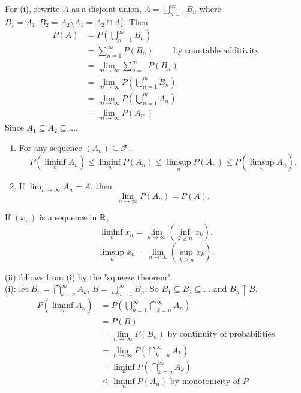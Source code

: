 \documentclass[class=article,crop=false]{standalone}
\begin{document}
\begin{prf}
	For (i), rewrite  $A$ as a disjoint union,  $A = \bigcup_{ n =1}^{\infty} B_n$ where $B_1=A_1, B_2 = A_2 \setminus A_1 = A_2 \cap A_1^{c} $. Then
	\begin{align*}
		P(A) &= P(\bigcup_{ n =1}^{\infty} B_n)\\
		     &= \sum_{ n=1}^{\infty} P(B_n) \qquad \text{ by countable additivity} \\
		     &= \lim_{ m \to \infty} \sum_{ n=1}^{ m} P(B_n) \\
		     &= \lim_{ m \to \infty} P\left( \bigcup_{ n=1}^{m} B_n \right)  \\
		     &= \lim_{ m \to \infty} P\left( \bigcup_{ n=1}^{m} A_n \right)  \\
		     &= \lim_{ m \to \infty} P(A_m) 
	\end{align*}
	Since $ A_1 \subseteq A_2 \subseteq \ldots$.
\end{prf}

\begin{thm}[4.1]
\begin{enumerate}[label=(\roman*)]
	\item For any sequence $(A_n) \subseteq \mathcal{F}$. 
		\[
			P\left( \liminf_{ n} A_n \right) \leq \liminf_{ n} P(A_n) \leq \limsup_{ n} P(A_n) \leq P(\limsup_{ n} A_n)
		.\] 
	\item If $\lim_{ n \to \infty} A_n= A$, then
		\[
			\lim_{ n \to \infty} P(A_n) = P(A)
		.\] 
\end{enumerate}
\end{thm}
\begin{defn}[]
	If $(x_n)$ is a sequence in $\mathbb{R}$,
	\[
		\liminf_{ n} x_n = \lim_{ n \to \infty} \left( \inf_{k\geq n} x_k \right) 
	.\] 
	\[
		\limsup_{ n} x_n = \lim_{ n \to \infty} \left( \sup_{k\geq n} x_k \right) 
	.\] 
\end{defn}

\begin{prf}
	(ii) follows from (i) by the "squeeze theorem".\\

(i): let $B_n = \bigcap_{ k =n}^{\infty} A_k$, $B = \bigcup_{ n =1}^{\infty} B_n$. So $B_1 \subseteq  B_2 \subseteq \ldots$ and $B_n \uparrow B$.
\begin{align*}
	P(\liminf_{ n} A_n) &= P\left( \bigcup_{ n= 1}^{\infty} \bigcap_{k= n}^{\infty} A_n \right)  \\
			    &= P(B) \\
			    &= \lim_{ n \to \infty} P(B_n) \text{ by continuity of probabilities}  \\
			    &= \lim_{ n \to \infty} P\left( \bigcap_{ k =n}^{\infty}A_k  \right)  \\
			    &= \liminf_{ n} P\left( \bigcap_{ k =n}^{\infty} A_k \right)  \\
			    &\leq \liminf_{ n} P(A_n)  \text{ by monotonicity of } P 
\end{align*}
\end{prf}
\end{document}
